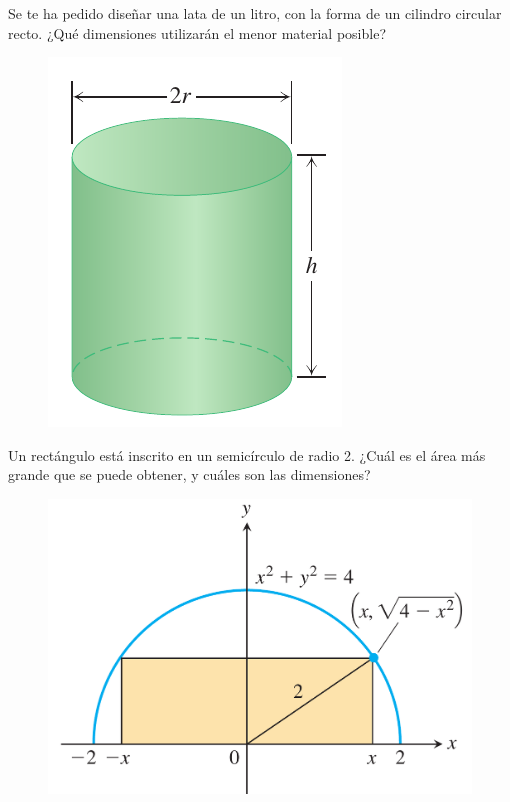 	Se te ha pedido diseñar una lata de un litro, con la forma de un cilindro circular recto. ¿Qué dimensiones utilizarán el menor material posible?




	\begin{figure}
		\centering
		\includegraphics[height=0.7\textheight]{./calculo/thomas_04_38}
		\label{fig:thomas0438}
	\end{figure}




	Un rectángulo está inscrito en un semicírculo de radio 2. ¿Cuál es el área más grande que se puede obtener, y cuáles son las dimensiones?




	\begin{figure}
		\centering
		\includegraphics[height=.7\textheight]{./calculo/thomas_04_40}
		\caption{}
		\label{fig:thomas0440}
	\end{figure}



